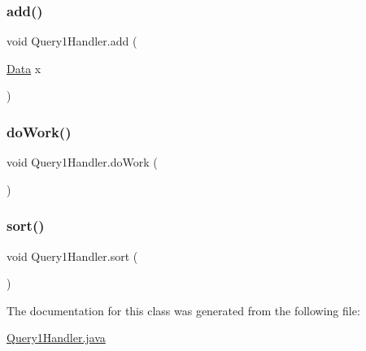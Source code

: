 \subsubsection{\texorpdfstring{add()}{add()}}
{\footnotesize\ttfamily void Query1\+Handler.\+add (\begin{DoxyParamCaption}\item[{\hyperlink{class_data}{Data}}]{x }\end{DoxyParamCaption})}

\hypertarget{class_query1_handler_ab3667be62a56c75f35e951d609b9a253}{}\label{class_query1_handler_ab3667be62a56c75f35e951d609b9a253} 
\subsubsection{\texorpdfstring{do\+Work()}{doWork()}}
{\footnotesize\ttfamily void Query1\+Handler.\+do\+Work (\begin{DoxyParamCaption}{ }\end{DoxyParamCaption})}

\hypertarget{class_query1_handler_a4e48d3e6ee1d7f644eeb165c980ac1b6}{}\label{class_query1_handler_a4e48d3e6ee1d7f644eeb165c980ac1b6} 
\subsubsection{\texorpdfstring{sort()}{sort()}}
{\footnotesize\ttfamily void Query1\+Handler.\+sort (\begin{DoxyParamCaption}{ }\end{DoxyParamCaption})}



The documentation for this class was generated from the following file\+:\begin{DoxyCompactItemize}
\item 
\hyperlink{_query1_handler_8java}{Query1\+Handler.\+java}\end{DoxyCompactItemize}
